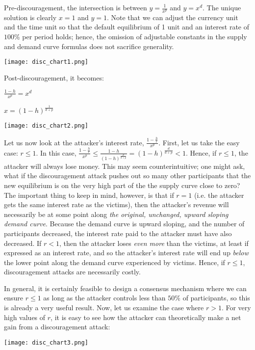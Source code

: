 \documentclass[12pt]{article}
\begin{document}
Pre-discouragement, the intersection is between $y = \frac{1}{x^p}$ and $y = x^d$. The unique solution is clearly $x=1$ and $y=1$. Note that we can adjust the currency unit and the time unit so that the default equilibrium of 1 unit and an interest rate of $100\%$ per period holds; hence, the omission of adjustable constants in the supply and demand curve formulas does not sacrifice generality.

\texttt{[image: disc\_chart1.png]}

Post-discouragement, it becomes:

$\frac{1-h}{x^p} = x^d$

$x=(1-h)^{\frac{1}{d+p}}$

\texttt{[image: disc\_chart2.png]}

Let us now look at the attacker's interest rate, $\frac{1-\frac{h}{r}}{x^p}$. First, let us take the easy case: $r \le 1$. In this case, $\frac{1-\frac{h}{r}}{x^p} \le \frac{1-h}{(1-h)^{\frac{p}{d+p}}} = (1-h)^{\frac{d}{d+p}} < 1$. Hence, if $r \le 1$, the attacker will always lose money. This may seem counterintuitive; one might ask, what if the discouragement attack pushes out so many other participants that the new equilibrium is on the very high part of the the supply curve close to zero? The important thing to keep in mind, however, is that if $r = 1$ (i.e. the attacker gets the same interest rate as the victims), then the attacker's revenue will necessarily be at some point along \textit{the original, unchanged, upward sloping demand curve}. Because the demand curve is upward sloping, and the number of participants decreased, the interest rate paid to the attacker must have also decreased. If $r < 1$, then the attacker loses \textit{even more} than the victims, at least if expressed as an interest rate, and so the attacker's interest rate will end up \textit{below} the lower point along the demand curve experienced by victims. Hence, if $r \le 1$, discouragement attacks are necessarily costly.

In general, it is certainly feasible to design a consensus mechanism where we can ensure $r \le 1$ as long as the attacker controls less than $50\%$ of participants, so this is already a very useful result. Now, let us examine the case where $r > 1$. For very high values of $r$, it is easy to see how the attacker can theoretically make a net gain from a discouragement attack:

\texttt{[image: disc\_chart3.png]}
\end{document}
